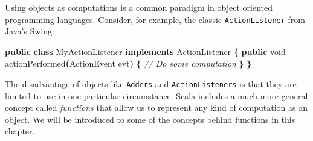 \documentclass[11pt,a5paper,]{book}
\newenvironment{Shaded}{\begin{snugshade}}{\end{snugshade}}
\newcommand{\BuiltInTok}[1]{#1}
\newcommand{\CommentTok}[1]{\textcolor[rgb]{0.56,0.35,0.01}{\textit{#1}}}
\newcommand{\DataTypeTok}[1]{\textcolor[rgb]{0.13,0.29,0.53}{#1}}
\newcommand{\FunctionTok}[1]{\textcolor[rgb]{0.00,0.00,0.00}{#1}}
\newcommand{\KeywordTok}[1]{\textcolor[rgb]{0.13,0.29,0.53}{\textbf{#1}}}
\newcommand{\NormalTok}[1]{#1}
\newcommand{\OperatorTok}[1]{\textcolor[rgb]{0.81,0.36,0.00}{\textbf{#1}}}
\begin{document}
Using objects as computations is a common paradigm in object oriented
programming languages. Consider, for example, the classic
\texttt{ActionListener} from Java's Swing:

\begin{Shaded}
\begin{Highlighting}[]
\KeywordTok{public} \KeywordTok{class}\NormalTok{ MyActionListener }\KeywordTok{implements} \BuiltInTok{ActionListener} \OperatorTok{\{}
  \KeywordTok{public} \DataTypeTok{void} \FunctionTok{actionPerformed}\OperatorTok{(}\BuiltInTok{ActionEvent}\NormalTok{ evt}\OperatorTok{)} \OperatorTok{\{}
    \CommentTok{// Do some computation}
  \OperatorTok{\}}
\OperatorTok{\}}
\end{Highlighting}
\end{Shaded}

The disadvantage of objects like \texttt{Adders} and
\texttt{ActionListeners} is that they are limited to use in one
particular circumstance. Scala includes a much more general concept
called \emph{functions} that allow us to represent any kind of
computation as an object. We will be introduced to some of the concepts
behind functions in this chapter.





\end{document}
